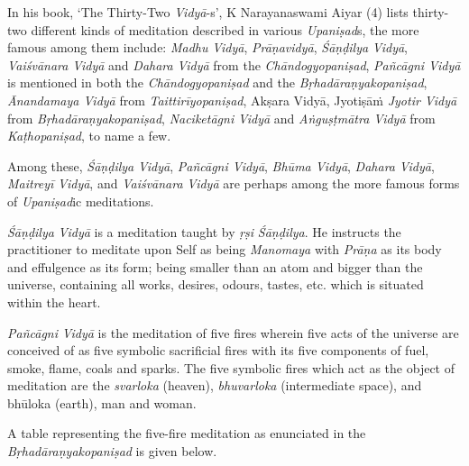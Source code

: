 In his book, `The Thirty-Two \emph{Vidyā}-s', K Narayanaswami Aiyar (4) lists thirty-two different kinds of meditation described in various \emph{Upaniṣad}s, the more famous among them include: \emph{Madhu} \emph{Vidyā}, \emph{Prāṇavidyā}, \emph{Śāṇḍilya} \emph{Vidyā}, \emph{Vaiśvānara} \emph{Vidyā} and \emph{Dahara} \emph{Vidyā} from the \emph{Chāndogyopaniṣad}, \emph{Pañcāgni Vidyā} is mentioned in both the \emph{Chāndogyopaniṣad} and the \emph{Bṛhadāraṇyakopaniṣad}, \emph{Ānandamaya Vidyā} from \emph{Taittirīyopaniṣad}, Akṣara Vidyā, Jyotiṣāṁ \emph{Jyotir Vidyā} from \emph{Bṛhadāraṇyakopaniṣad}, \emph{Naciketāgni} \emph{Vidyā} and \emph{Aṅguṣṭmātra Vidyā} from \emph{Kaṭhopaniṣad}, to name a few.

Among these, \emph{Śāṇḍilya} \emph{Vidyā}, \emph{Pañcāgni Vidyā}, \emph{Bhūma Vidyā}, \emph{Dahara} \emph{Vidyā}, \emph{Maitreyī} \emph{Vidyā}, and \emph{Vaiśvānara} \emph{Vidyā} are perhaps among the more famous forms of \emph{Upaniṣad}ic meditations.

\emph{Śāṇḍilya} \emph{Vidyā} is a meditation taught by \emph{ṛṣi} \emph{Śāṇḍilya}. He instructs the practitioner to meditate upon Self as being \emph{Manomaya} with \emph{Prāṇa} as its body and effulgence as its form; being smaller than an atom and bigger than the universe, containing all works, desires, odours, tastes, etc. which is situated within the heart.

\emph{Pañcāgni} \emph{Vidyā} is the meditation of five fires wherein five acts of the universe are conceived of as five symbolic sacrificial fires with its five components of fuel, smoke, flame, coals and sparks. The five symbolic fires which act as the object of meditation are the \emph{svarloka} (heaven), \emph{bhuvarloka} (intermediate space), and bhūloka (earth), man and woman.

A table representing the five-fire meditation as enunciated in the \emph{Bṛhadāraṇyakopaniṣad} is given below.

